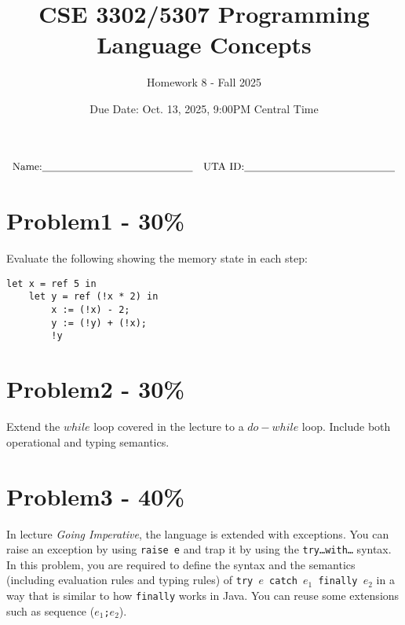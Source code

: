 \documentclass{article}
\newcommand{\answerboxbig}{
    \vspace{20cm} %
}
\newcommand{\studentinfo}{
    $$\begin{array}{cc}
        \noindent \text{Name:} \underline{\hspace{5cm}} &
            \text{UTA ID:} \underline{\hspace{5cm}}\\
    \end{array}$$
}
\begin{document}
\title{CSE 3302/5307 Programming Language Concepts}
\author{Homework 8 - Fall 2025}
\date{Due Date: Oct. 13, 2025, 9:00PM Central Time}
\maketitle
\thispagestyle{fancy}

\studentinfo

\section*{Problem1 - 30\%}
Evaluate the following showing the memory state in each step:

\begin{lstlisting}
let x = ref 5 in
    let y = ref (!x * 2) in
        x := (!x) - 2;
        y := (!y) + (!x);
        !y
\end{lstlisting}

\answerboxbig

\section*{Problem2 - 30\%}

Extend the $while$ loop covered in the lecture to a $do-while$ loop. Include both operational and typing semantics.

\answerboxbig

\section*{Problem3 - 40\%}

In lecture \emph{Going Imperative}, the language is extended with exceptions.
You can raise an exception by using \texttt{raise e} and trap it by using
the \texttt{try\dots with\dots} syntax.
In this problem, you are required to define the syntax and the semantics
(including evaluation rules and typing rules) of \texttt{try $e$ catch $e_1$ finally $e_2$}
in a way that is similar to how \texttt{finally} works in Java.
You can reuse some extensions such as sequence (\texttt{$e_1$;$e_2$}).

\answerboxbig
\end{document}
